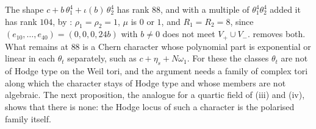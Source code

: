The shape $c+b\,\theta_{1}^{4}+\iota(b)\,\theta_{2}^{4}$ has rank $88$, and
with a multiple of $\theta_{1}^{4}\theta_{2}^{4}$ added it has rank $104$,
by : $\rho_{1}=\rho_{2}=1$, $\mu$ is $0$ or $1$, and
$R_{1}=R_{2}=8$, since $(e_{10},\dots,e_{40})=(0,0,0,24b)$ with $b\ne0$ does
not meet $V_{+}\cup V_{-}$.  removes
both. What remains at $88$ is a Chern character whose polynomial part is
exponential or linear in each $\theta_{t}$ separately, such as
$c+\eta_{s}+N\omega_{1}$. For these the classes $\theta_{t}$ are not of Hodge
type on the Weil tori, and the argument needs a family of complex tori along
which the character stays of Hodge type and whose members are not algebraic.
The next proposition, the analogue for a quartic field of
(iii) and (iv), shows that there is none: the Hodge
locus of such a character is the polarised family itself.

